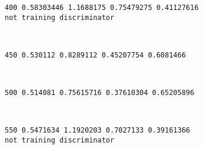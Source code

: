 \documentclass[11pt]{article}
\begin{document}
    \begin{Verbatim}[commandchars=\\\{\}]
400 0.58303446 1.1688175 0.75479275 0.41127616
not training discriminator

    \end{Verbatim}

    \begin{center}
    \end{center}
    { \hspace*{\fill} \\}
    
    \begin{Verbatim}[commandchars=\\\{\}]
450 0.530112 0.8289112 0.45207754 0.6081466

    \end{Verbatim}

    \begin{center}
    \end{center}
    { \hspace*{\fill} \\}
    
    \begin{Verbatim}[commandchars=\\\{\}]
500 0.514081 0.75615716 0.37610304 0.65205896

    \end{Verbatim}

    \begin{center}
    \end{center}
    { \hspace*{\fill} \\}
    
    \begin{Verbatim}[commandchars=\\\{\}]
550 0.5471634 1.1920203 0.7027133 0.39161366
not training discriminator

    \end{Verbatim}

    \begin{center}
    \end{center}
    { \hspace*{\fill} \\}
    
\end{document}
